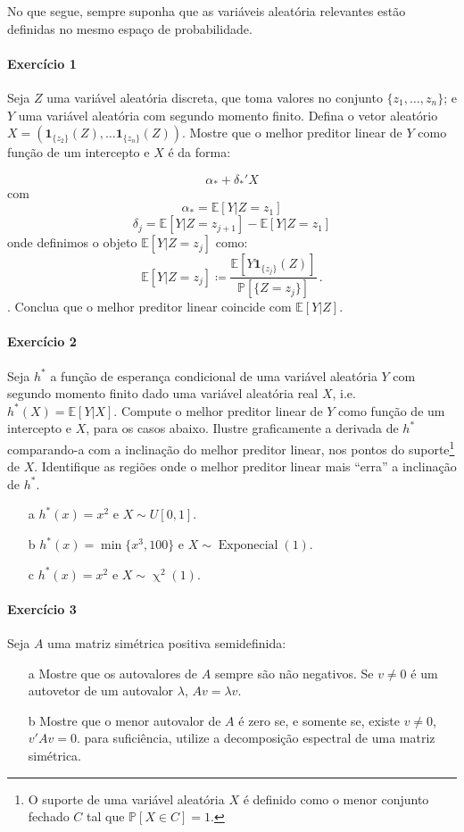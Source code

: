 \documentclass[10pt,a4paper]{article}
\title{}
\author{\normalsize Exercícios sobre Modelos Lineares}
\date{}
\begin{document}
	\maketitle
	No que segue, sempre suponha que as variáveis aleatória relevantes estão definidas no mesmo espaço de probabilidade.
 \paragraph{Exercício 1} Seja $Z$ uma variável aleatória discreta, que toma valores no conjunto $\{z_1,\ldots, z_n\}$; e $Y$ uma variável aleatória com segundo momento finito. Defina o vetor aleatório $X  = (\mathbf{1}_{\{z_2\}}(Z),\ldots \mathbf{1}_{\{z_n\}}(Z))$. Mostre que o melhor preditor linear de $Y$ como função de um intercepto e $X$ é da forma:
 
 $$\alpha_* + \delta_*'X$$
 com
 $$ \alpha_* =  \mathbb{E}[Y|Z=z_1]$$
$$\delta_j =   \mathbb{E}[Y|Z=z_{j+1}]-\mathbb{E}[Y|Z=z_1]$$
onde definimos o objeto $\mathbb{E}[Y|Z=z_j]$ como:
$$\mathbb{E}[Y|Z=z_j] \coloneqq \frac{\mathbb{E}[Y\mathbf{1}_{\{z_j\}}(Z)]}{\mathbb{P}[\{Z = z_j\}]}\, .$$. Conclua que o melhor preditor linear coincide com $\mathbb{E}[Y|Z]$.

\paragraph{Exercício 2} Seja $h^*$ a função de esperança condicional de uma variável aleatória $Y$ com segundo momento finito dado uma variável aleatória real $X$, i.e. $h^*(X) = \mathbb{E}[Y|X]$. Compute o melhor preditor linear de $Y$ como função de um intercepto e $X$, para os casos abaixo. Ilustre graficamente a derivada de $h^*$ comparando-a com a inclinação do melhor preditor linear, nos pontos do suporte\footnote{O suporte de uma variável aleatória $X$ é definido como o menor conjunto fechado $C$ tal que $\mathbb{P}[X \in C]=1$.} de $X$. Identifique as regiões onde o melhor preditor linear mais ``erra'' a inclinação de $h^*$.

\begin{itemize}
	\item[a] $h^*(x) = x^2 $ e $X\sim U[0,1]$.
	\item[b] $h^*(x) = \min\{x^3,100\}$ e $X \sim \operatorname{Exponecial}(1)$.
	\item[c] $h^*(x) = x^2$ e $X \sim \operatorname{\chi}^2(1)$.
\end{itemize}

 \paragraph{Exercício 3} Seja $A$ uma matriz simétrica positiva semidefinida:
 \begin{itemize}
 	\item[a] Mostre que os autovalores de $A$ sempre são não negativos.  Se $v\neq 0$ é um autovetor de um autovalor $\lambda$, $Av=\lambda v$.
 	\item[b] Mostre que o menor autovalor de $A$ é zero se, e somente se, existe $v \neq 0$, $v'Av = 0$.  para suficiência, utilize a decomposição espectral de uma matriz simétrica.
 \end{itemize} 
 
\end{document}
